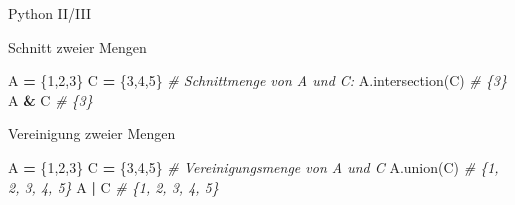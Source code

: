 \documentclass[12pt,ngerman,a4paper,ignorenonframetext,]{beamer}
\newenvironment{Shaded}{\begin{snugshade}}{\end{snugshade}}
\newcommand{\CommentTok}[1]{\textcolor[rgb]{0.56,0.35,0.01}{\textit{#1}}}
\newcommand{\DecValTok}[1]{\textcolor[rgb]{0.00,0.00,0.81}{#1}}
\newcommand{\NormalTok}[1]{#1}
\newcommand{\OperatorTok}[1]{\textcolor[rgb]{0.81,0.36,0.00}{\textbf{#1}}}
\begin{document}
\begin{frame}[fragile]{Python II/III}
\protect\hypertarget{python-iiiii}{}

Schnitt zweier Mengen

\begin{Shaded}
\begin{Highlighting}[]
\NormalTok{A }\OperatorTok{=}\NormalTok{ \{}\DecValTok{1}\NormalTok{,}\DecValTok{2}\NormalTok{,}\DecValTok{3}\NormalTok{\}}
\NormalTok{C }\OperatorTok{=}\NormalTok{ \{}\DecValTok{3}\NormalTok{,}\DecValTok{4}\NormalTok{,}\DecValTok{5}\NormalTok{\} }
\CommentTok{# Schnittmenge von A und C:}
\NormalTok{A.intersection(C)  }\CommentTok{# \{3\}}
\NormalTok{A }\OperatorTok{&}\NormalTok{ C  }\CommentTok{# \{3\}}
\end{Highlighting}
\end{Shaded}

Vereinigung zweier Mengen

\begin{Shaded}
\begin{Highlighting}[]
\NormalTok{A }\OperatorTok{=}\NormalTok{ \{}\DecValTok{1}\NormalTok{,}\DecValTok{2}\NormalTok{,}\DecValTok{3}\NormalTok{\}}
\NormalTok{C }\OperatorTok{=}\NormalTok{ \{}\DecValTok{3}\NormalTok{,}\DecValTok{4}\NormalTok{,}\DecValTok{5}\NormalTok{\}}
\CommentTok{# Vereinigungsmenge von A und C}
\NormalTok{A.union(C)  }\CommentTok{# \{1, 2, 3, 4, 5\}}
\NormalTok{A }\OperatorTok{|}\NormalTok{ C }\CommentTok{#  \{1, 2, 3, 4, 5\}}
\end{Highlighting}
\end{Shaded}

\end{frame}
\end{document}

